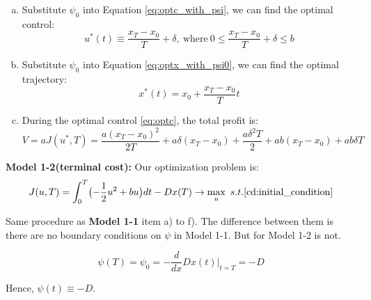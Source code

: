 \documentclass{article}
\begin{document}
\begin{enumerate}[a)]
    \item    Substitute $\psi_0$ into Equation \eqref{eq:optc_with_psi}, we can find the optimal control:
        \begin{equation}\label{eq:optc}
            u^*(t)\equiv\frac{x_T-x_0}{T}+\delta,\ \text{where}\ 0\leq\frac{x_T-x_0}{T}+\delta\leq b
        \end{equation}
    \item Substitute $\psi_0$ into Equation \eqref{eq:optx_with_psi0}, we can find the optimal trajectory:
        \begin{equation}\label{eq:optx}
            x^*(t)=x_0+\frac{x_T-x_0}{T}t
        \end{equation}
    \item During the optimal control \eqref{eq:optc}, the total profit is:
        \begin{equation}
            V=aJ(u^*,T)=\frac{a(x_T-x_0)^2}{2T}+a\delta(x_T-x_0)+\frac{a\delta^2T}{2}+ab(x_T-x_0)+ab\delta T
        \end{equation}
\end{enumerate}

{\bf Model 1-2(terminal cost):} Our optimization problem is:
\begin{equation}
    J(u,T)=\int_{0}^{T}\bigl(-\frac{1}{2}u^2+bu\bigr)dt-Dx(T)\rightarrow \max_{u}\ s.t. \eqref{cd:initial_condition}
\end{equation}

Same procedure as \textbf{Model 1-1} item a) to f). The difference between them is there are no boundary conditions on $\psi$ in Model 1-1. But for Model 1-2 is not.

\begin{equation}
    \psi(T)=\psi_0=-\frac{d}{dx}Dx(t)\bigg|_{t=T}=-D
\end{equation}

Hence, $\psi(t)\equiv-D$.
\end{document}
